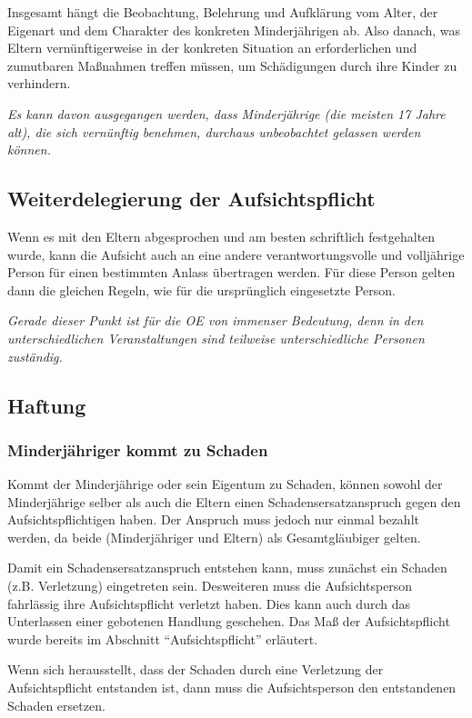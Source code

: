 \documentclass[a4paper,11pt]{scrartcl} %
\begin{document}
Insgesamt hängt die Beobachtung, Belehrung und Aufklärung vom Alter, der Eigenart und dem Charakter des konkreten Minderjährigen ab. Also danach, was Eltern vernünftigerweise in der konkreten Situation an erforderlichen und zumutbaren Maßnahmen treffen müssen, um Schädigungen durch ihre Kinder zu verhindern.

\textit{Es kann davon ausgegangen werden, dass Minderjährige (die meisten 17 Jahre alt), die sich vernünftig benehmen, durchaus unbeobachtet gelassen werden können.}

\subsection{Weiterdelegierung der Aufsichtspflicht}

Wenn es mit den Eltern abgesprochen und am besten schriftlich festgehalten wurde, kann die Aufsicht auch an eine andere verantwortungsvolle und volljährige Person für einen bestimmten Anlass übertragen werden. Für diese Person gelten dann die gleichen Regeln, wie für die ursprünglich eingesetzte Person.

\textit{Gerade dieser Punkt ist für die OE von immenser Bedeutung, denn in den unterschiedlichen Veranstaltungen sind teilweise unterschiedliche Personen zuständig.}

\subsection{Haftung}

\subsubsection*{Minderjähriger kommt zu Schaden}

Kommt der Minderjährige oder sein Eigentum zu Schaden, können sowohl der Minderjährige selber als auch die Eltern einen Schadensersatzanspruch gegen den Aufsichtspflichtigen haben. Der Anspruch muss jedoch nur einmal bezahlt werden, da beide (Minderjähriger und Eltern) als Gesamtgläubiger gelten.

Damit ein Schadensersatzanspruch entstehen kann, muss zunächst ein Schaden (z.B. Verletzung) eingetreten sein. Desweiteren muss die Aufsichtsperson fahrlässig ihre Aufsichtspflicht verletzt haben. Dies kann auch durch das Unterlassen einer gebotenen Handlung geschehen. Das Maß der Aufsichtspflicht wurde bereits im Abschnitt "`Aufsichtspflicht"' erläutert.

Wenn sich herausstellt, dass der Schaden durch eine Verletzung der Aufsichtspflicht entstanden ist, dann muss die Aufsichtsperson den entstandenen Schaden ersetzen.
\end{document}
